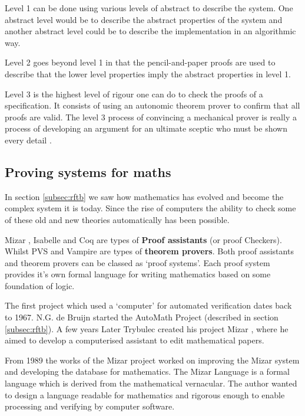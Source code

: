 Level 1 can be done using various levels of abstract to describe the system. One
abstract level would be to describe the abstract properties of the system and
another abstract level could be to describe the implementation in an algorithmic
way.

Level 2 goes beyond level 1 in that the pencil-and-paper proofs are used to
describe that the lower level properties imply the abstract properties in level
1.

Level 3 is the highest level of rigour one can do to check the proofs of a
specification. It consists of using an autonomic theorem prover to confirm that
all proofs are valid. The level 3 process of convincing a mechanical prover is
really a process of developing an argument for an ultimate sceptic who must be
shown every detail \cite{encyclopedia}.

\subsection{Proving systems for maths}

In section \ref{subsec:rftb} we saw how mathematics has evolved and become the
complex system it is today. Since the rise of computers the ability to check
some of these old and new theories automatically has been possible.

Mizar \cite{mizar}, Isabelle \cite{isabelle} and Coq \cite{coq} are types of
\textbf{Proof assistants} (or proof Checkers). Whilst PVS and Vampire are types
of \textbf{theorem provers}. Both proof assistants and theorem provers can be
classed as `proof systems'. Each proof system provides it's own formal language
for writing mathematics based on some foundation of logic.

The first project which used a `computer' for automated verification dates back
to 1967. N.G. de Bruijn started the AutoMath Project (described in section
\ref{subsec:rftb}). A few years Later Trybulec created his project Mizar
\cite{mizar}, where he aimed to develop a computerised assistant to edit
mathematical papers.

From 1989 the works of the Mizar project worked on improving the Mizar system
and developing the database for mathematics. The Mizar Language is a formal
language which is derived from the mathematical vernacular. The author wanted to
design a language readable for mathematics and rigorous enough to enable
processing and verifying by computer software.

